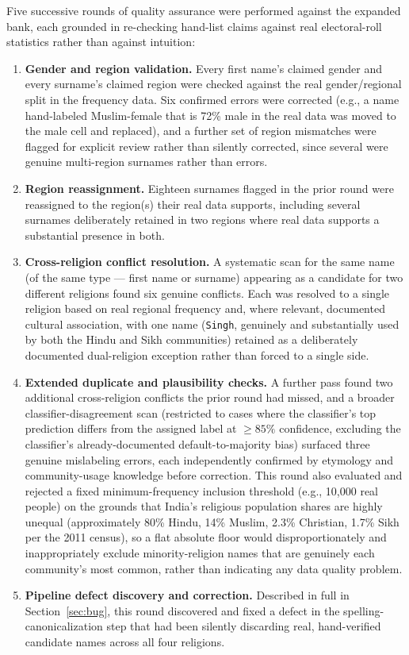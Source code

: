 \documentclass[11pt]{article}
\begin{document}
Five successive rounds of quality assurance were performed against the expanded bank, each grounded in re-checking hand-list claims against real electoral-roll statistics rather than against intuition:

\begin{enumerate}[leftmargin=*]
\item \textbf{Gender and region validation.} Every first name's claimed gender and every surname's claimed region were checked against the real gender/regional split in the frequency data. Six confirmed errors were corrected (e.g., a name hand-labeled Muslim-female that is 72\% male in the real data was moved to the male cell and replaced), and a further set of region mismatches were flagged for explicit review rather than silently corrected, since several were genuine multi-region surnames rather than errors.
\item \textbf{Region reassignment.} Eighteen surnames flagged in the prior round were reassigned to the region(s) their real data supports, including several surnames deliberately retained in two regions where real data supports a substantial presence in both.
\item \textbf{Cross-religion conflict resolution.} A systematic scan for the same name (of the same type --- first name or surname) appearing as a candidate for two different religions found six genuine conflicts. Each was resolved to a single religion based on real regional frequency and, where relevant, documented cultural association, with one name (\texttt{Singh}, genuinely and substantially used by both the Hindu and Sikh communities) retained as a deliberately documented dual-religion exception rather than forced to a single side.
\item \textbf{Extended duplicate and plausibility checks.} A further pass found two additional cross-religion conflicts the prior round had missed, and a broader classifier-disagreement scan (restricted to cases where the classifier's top prediction differs from the assigned label at $\geq 85\%$ confidence, excluding the classifier's already-documented default-to-majority bias) surfaced three genuine mislabeling errors, each independently confirmed by etymology and community-usage knowledge before correction. This round also evaluated and rejected a fixed minimum-frequency inclusion threshold (e.g., 10,000 real people) on the grounds that India's religious population shares are highly unequal (approximately 80\% Hindu, 14\% Muslim, 2.3\% Christian, 1.7\% Sikh per the 2011 census), so a flat absolute floor would disproportionately and inappropriately exclude minority-religion names that are genuinely each community's most common, rather than indicating any data quality problem.
\item \textbf{Pipeline defect discovery and correction.} Described in full in Section~\ref{sec:bug}, this round discovered and fixed a defect in the spelling-canonicalization step that had been silently discarding real, hand-verified candidate names across all four religions.
\end{enumerate}
\end{document}
